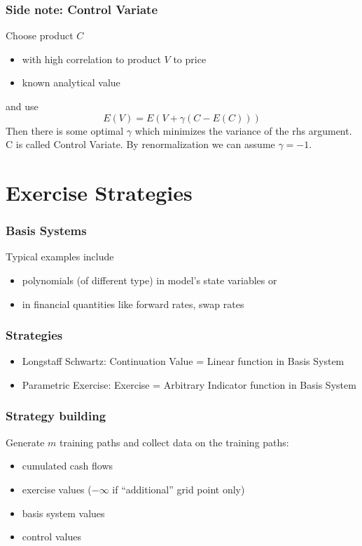 \documentclass{beamer}
\begin{document}
\begin{frame}
\frametitle{Side note: Control Variate}
Choose product $C$
\vspace{\baselineskip}
\begin{itemize}
\item with high correlation to product $V$ to price
\item known analytical value
\end{itemize}
\vspace{\baselineskip}
and use
\begin{equation}
E(V) = E(V+\gamma(C-E(C)))
\end{equation}
Then there is some optimal $\gamma$ which minimizes the variance of the rhs argument. C is called Control Variate. By renormalization we can assume $\gamma = -1$.
\end{frame}

\section{Exercise Strategies}

\begin{frame}
\frametitle{Basis Systems}
Typical examples include
\vspace{\baselineskip}
\begin{itemize}
\item polynomials (of different type) in model's state variables or
\item in financial quantities like forward rates, swap rates
\end{itemize}
\end{frame}

\begin{frame}
\frametitle{Strategies}
\vspace{\baselineskip}
\begin{itemize}
\item Longstaff Schwartz: Continuation Value = Linear function in Basis System
\item Parametric Exercise: Exercise = Arbitrary Indicator function in Basis System
\end{itemize}
\end{frame}

\begin{frame}
\frametitle{Strategy building}
Generate $m$ training paths and collect data on the training paths:
\vspace{\baselineskip}
\begin{itemize}
\item cumulated cash flows
\item exercise values ($-\infty$ if ``additional'' grid point only)
\item basis system values
\item control values
\end{itemize}
\end{frame}
\end{document}

